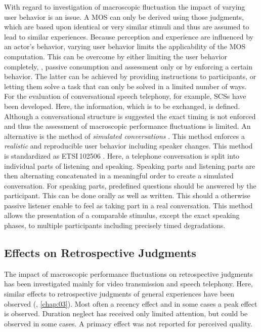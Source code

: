 With regard to investigation of macroscopic fluctuation the impact of varying user behavior is an issue.
A \ac{MOS} can only be derived using those judgments, which are based upon identical or very similar stimuli and thus are assumed to lead to similar experiences.
Because perception and experience are influenced by an actor's behavior, varying user behavior limits the applicability of the \ac{MOS} computation.
This can be overcome by either limiting the user behavior completely, \ie, passive consumption and assessment only or by enforcing a certain behavior.
The latter can be achieved by providing instructions to participants, or letting them solve a task that can only be solved in a limited number of ways.
For the evaluation of conversational speech telephony, for example, \acp{SCS} have been developed.
Here, the information, which is to be exchanged, is defined.
Although a conversational structure is suggested the exact timing is not enforced and thus the assessment of macroscopic performance fluctuations is limited.
An alternative is the method of \emph{simulated conversations} \citep{weiss_modeling_2009, berger_estimation_2008}.
This method enforces a \emph{realistic} and reproducible user behavior including speaker changes.
This method is standardized as ETSI\,102506 \citep{etsi_speech_2011}.
Here, a telephone conversation is split into individual parts of listening and speaking.
Speaking parts and listening parts are then alternating concatenated in a meaningful order to create a simulated conversation.
For speaking parts, predefined questions should be answered by the participant.
This can be done orally as well as written.
This should a otherwise passive listener enable to feel as taking part in a real conversation.
This method allows the presentation of a comparable stimulus, except the exact speaking phases, to multiple participants including precisely timed degradations.
\subsection{Effects on Retrospective Judgments}
The impact of macroscopic performance fluctuations on retrospective judgments has been investigated mainly for video transmission and speech telephony.
Here, similar effects to retrospective judgments of general experiences have been observed (\cf, \autoref{chap:03}).
Most often a recency effect and in some cases a peak effect is observed.
Duration neglect has received only limited attention, but could be observed in some cases.
A primacy effect was not reported for perceived quality.

